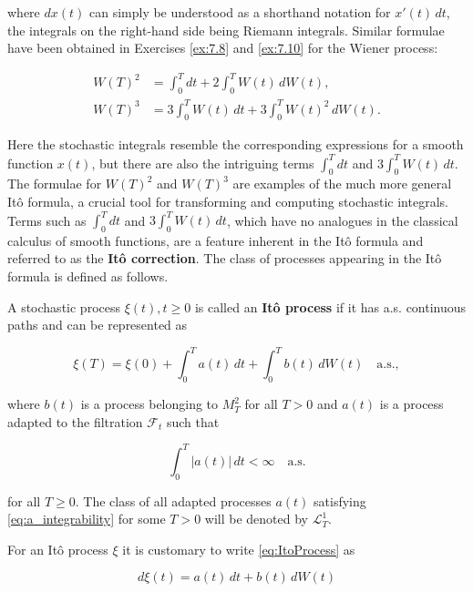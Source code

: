 where $dx(t)$ can simply be understood as a shorthand notation for $x'(t) \, dt$, the integrals on the right-hand side being Riemann integrals. Similar formulae have been obtained in Exercises \ref{ex:7.8} and \ref{ex:7.10} for the Wiener process:

\begin{align}
W(T)^2 & = \int_0^T dt + 2 \int_0^T W(t) \, dW(t), \\
W(T)^3 & = 3 \int_0^T W(t) \, dt + 3 \int_0^T W(t)^2 \, dW(t).
\end{align}

Here the stochastic integrals resemble the corresponding expressions for a smooth function $x(t)$, but there are also the intriguing terms $\int_0^T dt$ and $3 \int_0^T W(t) \, dt$. The formulae for $W(T)^2$ and $W(T)^3$ are examples of the much more general Itô formula, a crucial tool for transforming and computing stochastic integrals. Terms such as $\int_0^T dt$ and $3 \int_0^T W(t) \, dt$, which have no analogues in the classical calculus of smooth functions, are a feature inherent in the Itô formula and referred to as the \textbf{Itô correction}. The class of processes appearing in the Itô formula is defined as follows.

\begin{Definition}
\label{def:7.8}
A stochastic process $\xi(t), t \geq 0$ is called an \textbf{Itô process} if it has a.s. continuous paths and can be represented as

\begin{equation}
\xi(T) = \xi(0) + \int_0^T a(t) \, dt + \int_0^T b(t) \, dW(t) \quad \text{a.s.},
\label{eq:ItoProcess}
\end{equation}

where $b(t)$ is a process belonging to $M_T^2$ for all $T > 0$ and $a(t)$ is a process adapted to the filtration $\mathcal{F}_t$ such that

\begin{equation}
\int_0^T |a(t)| \, dt < \infty \quad \text{a.s.}
\label{eq:a_integrability}
\end{equation}

for all $T \geq 0$. The class of all adapted processes $a(t)$ satisfying \eqref{eq:a_integrability} for some $T > 0$ will be denoted by $\mathcal{L}_T^1$.
\end{Definition}

For an Itô process $\xi$ it is customary to write \eqref{eq:ItoProcess} as

\begin{equation}
d\xi(t) = a(t) \, dt + b(t) \, dW(t)
\label{eq:ItoDifferential}
\end{equation}

